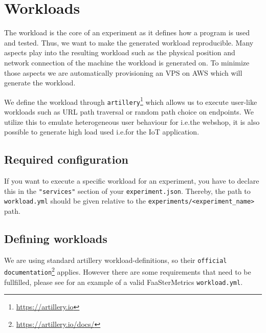 \documentclass[../main.tex]{subfiles}
\begin{document}
\section{Workloads}\label{sec:WorkloadsStructure}


The workload is the core of an experiment as it defines how a program is used and tested. 
Thus, we want to make the generated workload reproducible. 
Many aspects play into the resulting workload such as the physical position and network connection of the machine the workload is generated on. 
To minimize those aspects we are automatically provisioning an VPS on AWS which will generate the workload.

We define the workload through \texttt{artillery}\footnote{\url{https://artillery.io}} which allows us to 
execute user-like workloads such as URL path traversal or random path choice on endpoints. 
We utilize this to emulate heterogeneous user behaviour for i.e.\@ the webshop, 
it is also possible to generate high load used i.e.\@ for the IoT application.

\subsection{Required configuration}


If you want to execute a specific workload for an experiment, 
you have to declare this in the \texttt{"services"} section of your \texttt{experiment.json}.
Thereby, the path to \texttt{workload.yml} should be given relative to the \texttt{experiments/<experiment\_name>} path. 

\subsection{Defining workloads}

We are using standard artillery workload-definitions, 
so their \texttt{official documentation}\footnote{\url{https://artillery.io/docs/}} applies. 
However there are some requirements that need to be fullfilled, 
please see  for an example of a valid FaaSterMetrics \texttt{workload.yml}.
\end{document}
